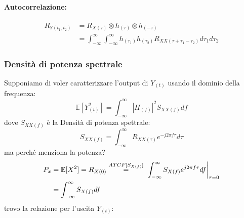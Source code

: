             \paragraph{Autocorrelazione:}
                \begin{align}
                    R_{Y(t_1,t_2)} &= R_{X(\tau)}\otimes h_{(\tau)} \otimes h_{(-\tau)} \nonumber \\
                                    &= \int_{-\infty}^{\infty}\int_{-\infty}^{\infty} h_{(\tau_1)}h_{(\tau_2)} R_{XX(\tau+\tau_1-\tau_2)} d\tau_1d\tau_2\nonumber
                \end{align}    
        \subsubsection{Densità di potenza spettrale}\label{Densita di potenza spettrale}
            Supponiamo di voler caratterizzare l'output di $Y_{(t)}$ usando il dominio della frequenza:
            \[
                \mathbb{E}[Y_{(t)}^2] = \int_{-\infty}^{\infty} \left|H_{(f)}\right|^2 S_{XX(f)} df  
            \]
            dove $S_{XX(f)}$ è la Densità di potenza spettrale:
            \[
                S_{XX(f)} = \int_{-\infty}^{\infty} R_{XX(\tau)} e^{-j2\pi f\tau}d\tau
            \]
            ma perché menziona la potenza?
            \begin{align}
                P_x &= \mathbb{E}[X^2] = R_{X(0)} \overset{ATCF[S_{X(f)}]}{=} \eval*{\int_{-\infty}^{\infty} S_{X(f)} e^{j2\pi f\tau}df}_{\tau=0} \nonumber \\
                    &=  \int_{-\infty}^{\infty} S_{X(f)}df \nonumber
            \end{align}
            trovo la relazione per l'uscita $Y_{(t)}$:
            \begin{figure}[H]
                \centering
            \end{figure}            
